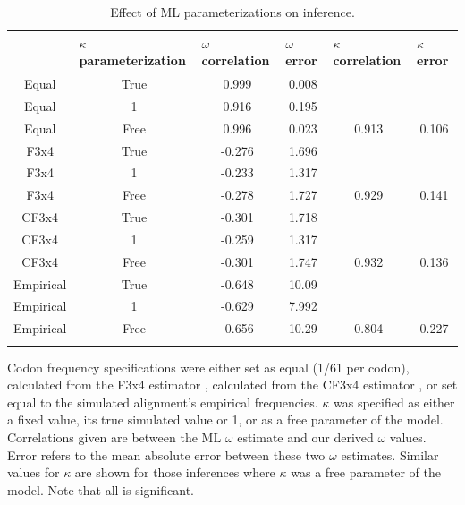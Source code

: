 \documentclass[11pt]{article}
\begin{document}
\begin{table}[htbp]
\caption {\label{tab:mlspec}Effect of ML parameterizations on inference.}
\begin{tabular}{c c c c c c}
\hline\noalign{\smallskip}
\multicolumn{1}{l}{Codon frequencies} & \multicolumn{1}{l}{$\kappa$ parameterization} & \multicolumn{1}{l}{$\omega$ correlation} &\multicolumn{1}{l}{$\omega$ error} & \multicolumn{1}{l}{$\kappa$ correlation} &\multicolumn{1}{l}{$\kappa$ error} \\
\hline\noalign{\smallskip}
Equal & True & 0.999 & 0.008 &   &   \\ %
Equal & 1 & 0.916 & 0.195 &   &   \\ 
Equal & Free & 0.996 & 0.023 & 0.913 & 0.106 \\ 
\hline\noalign{\smallskip}
F3x4 & True & -0.276 & 1.696 &   &   \\ 
F3x4 & 1 & -0.233 & 1.317 &   &   \\ 
F3x4 & Free & -0.278 & 1.727 & 0.929 & 0.141 \\ 
\hline\noalign{\smallskip}
CF3x4 & True & -0.301 & 1.718 &   &   \\ 
CF3x4 & 1 & -0.259 & 1.317 &   &   \\ 
CF3x4 & Free & -0.301 & 1.747 & 0.932 & 0.136 \\ 
\hline\noalign{\smallskip}
Empirical & True & -0.648 & 10.09 &   &   \\ 
Empirical & 1 & -0.629 & 7.992 &   &   \\ 
Empirical & Free & -0.656 & 10.29 & 0.804 & 0.227 \\ 
\noalign{\smallskip}\hline\noalign{\smallskip}
\end{tabular}
\newline
Codon frequency specifications were either set as equal (1/61 per codon), calculated from the F3x4 estimator \cite{MuseGaut1994}, calculated from the CF3x4 estimator \cite{Pond2010}, or set equal to the simulated alignment's empirical frequencies. $\kappa$ was specified as either a fixed value, its true simulated value or 1, or as a free parameter of the model. Correlations given are between the ML $\omega$ estimate and our derived $\omega$ values. Error refers to the mean absolute error between these two $\omega$ estimates. Similar values for $\kappa$ are shown for those inferences where $\kappa$ was a free parameter of the model. Note that all is significant.
\end{table}	
	
\end{document}
